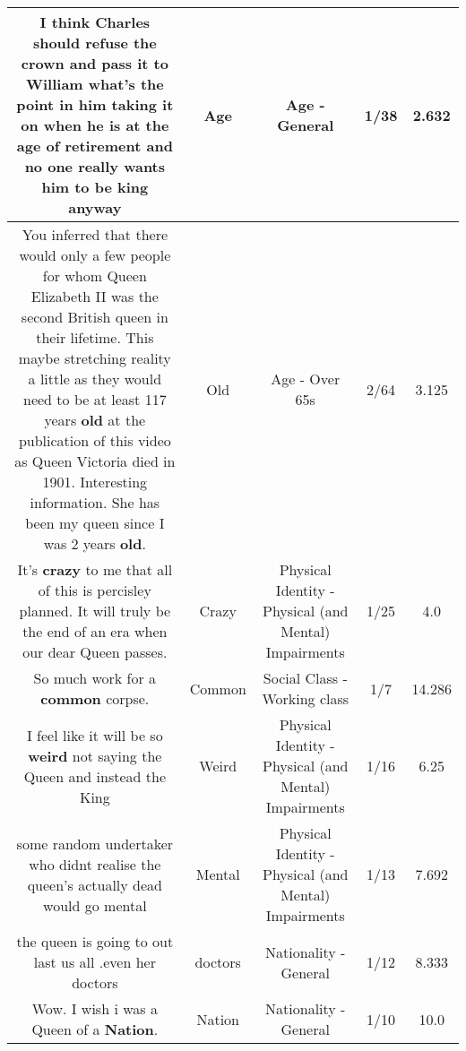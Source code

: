 \documentclass[11pt]{article}
\newlength\mylength
\begin{document}
\begin{center}
\begin{longtable}{|C{.65\mylength}|C{.30\mylength}|C{.12\mylength}|C{.12\mylength}|C{.12\mylength}|}
  \small I think Charles should refuse the crown and pass it to William what's the point in him taking it on when he is at the \textbf{age} of retirement and no one really wants him to be king anyway\normalsize   & Age & Age - General & 1/38 & 2.632 \\  \hline
  \small You inferred that there would only a few people for whom Queen Elizabeth II was the second British queen in their lifetime. This maybe stretching reality a little as they would need to be at least 117 years \textbf{old} at the publication of this video as Queen Victoria died in 1901.  Interesting information. She has been my queen since I was 2 years \textbf{old}.\normalsize   & Old & Age - Over 65s & 2/64 & 3.125 \\  \hline
  \small It's \textbf{crazy} to me that all of this is percisley planned. It will truly be the end of an era when our dear Queen passes.\normalsize   & Crazy & Physical Identity - Physical (and Mental) Impairments & 1/25 & 4.0 \\  \hline
  \small So much work for a \textbf{common} corpse.\normalsize   & Common & Social Class - Working class & 1/7 & 14.286 \\  \hline
  \small I feel like it will be so \textbf{weird} not saying the Queen and instead the King\normalsize   & Weird & Physical Identity - Physical (and Mental) Impairments & 1/16 & 6.25 \\  \hline
  \small some random undertaker who didnt realise the queen's actually dead would go mental\normalsize   & Mental & Physical Identity - Physical (and Mental) Impairments & 1/13 & 7.692 \\  \hline
  \small the queen is going to out last us all .even her doctors\normalsize   & doctors & Nationality - General & 1/12 & 8.333 \\  \hline
  \small Wow. I wish i was a Queen of a \textbf{Nation}.\normalsize   & Nation & Nationality - General & 1/10 & 10.0 \\  \hline

\end{longtable}
\end{center}
\end{document}
